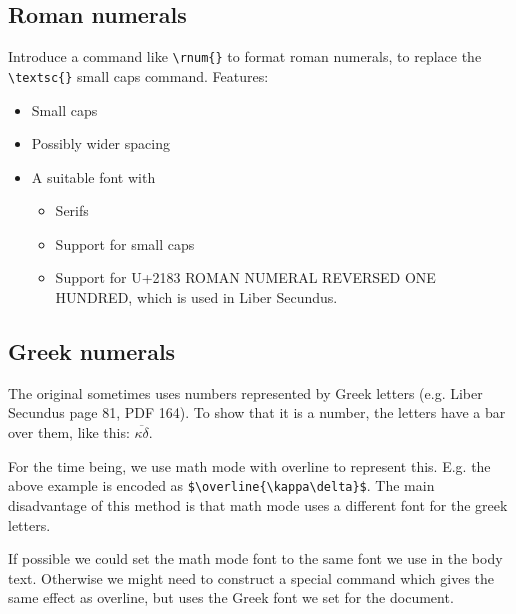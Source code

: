 \documentclass{report}
\begin{document}
\subsection{Roman numerals}
\label{subsec:roman_numerals}
Introduce a command like \verb+\rnum{}+ to format roman numerals, to replace
the \verb+\textsc{}+ small caps command. Features:
\begin{itemize}
\item Small caps
\item Possibly wider spacing
\item A suitable font with
\begin{itemize}
\item Serifs
\item Support for small caps
\item Support for U+2183 ROMAN NUMERAL REVERSED ONE HUNDRED, which is used
in Liber Secundus.
\end{itemize}

\end{itemize}

\subsection{Greek numerals}
\label{subsec:greek_numerals}
The original sometimes uses numbers represented by Greek letters
(e.g. Liber Secundus page 81, PDF 164). To show that it is a number, the
letters have a bar over them, like this: $\overline{\kappa\delta}$.

For the time being, we use math mode with overline to represent this.
E.g. the above example is encoded as \verb+$\overline{\kappa\delta}$+.
The main disadvantage of this method is that math mode uses a different
font for the greek letters.

If possible we could set the math mode font to the same font we use in the
body text. Otherwise we might need to construct a special command which gives
the same effect as overline, but uses the Greek font we set for the document.
\end{document}
